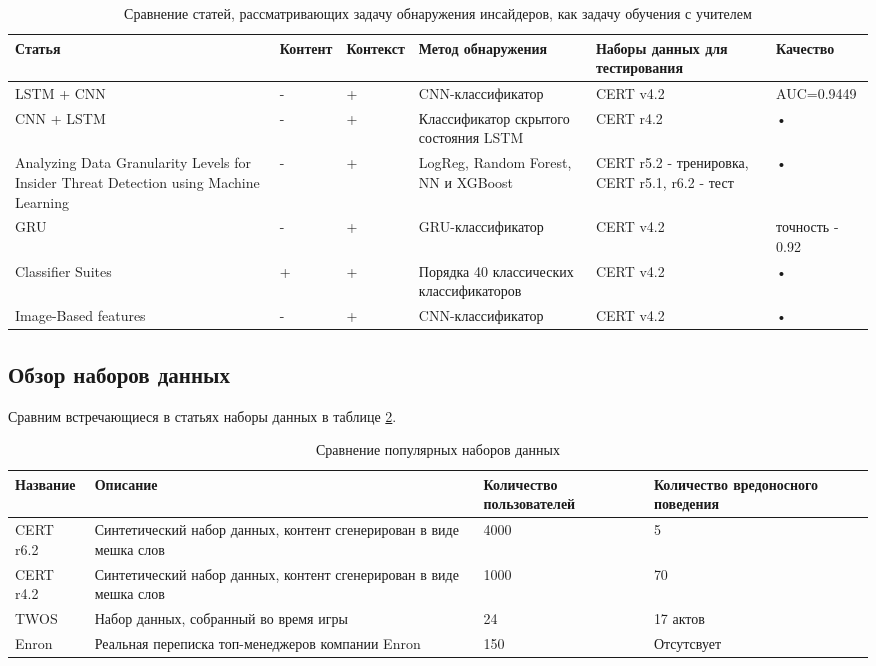 \begin{table}[!h]
\caption{Сравнение статей, рассматривающих задачу обнаружения инсайдеров, как задачу обучения с учителем}
\label{table:2} 
\begin{tabular}{|m{2cm}|m{2cm}|m{2cm}|m{2cm}|p{2cm}|p{2cm}|}
\hline 
Статья & Контент & Контекст & Метод обнаружения & Наборы данных для тестирования & Качество \\ 
\hline 
LSTM + CNN \cite{lstm_cnn} & - & + & CNN-классификатор & CERT v4.2 & AUC=0.9449 \\ 
\hline 
CNN + LSTM \cite{cnn_lstm} & - & + & Классификатор скрытого состояния LSTM & CERT r4.2 & • \\ 
\hline 
Analyzing Data Granularity Levels for Insider Threat Detection using Machine Learning \cite{granual} & - & + & LogReg, Random Forest, NN и XGBoost & CERT r5.2 - тренировка, CERT r5.1, r6.2 - тест   & • \\ 
\hline 
GRU \cite{gru} & - & + & GRU-классификатор & CERT v4.2 & точность - 0.92 \\ 
\hline 
Classifier Suites \cite{suites} & + & + & Порядка 40 классических классификаторов & CERT v4.2 & • \\ 
\hline 
Image-Based features \cite{imagebased} & - & + & CNN-классификатор & CERT v4.2 & • \\ 
\hline
\end{tabular}
\end{table}

\subsection{Обзор наборов данных}
Сравним встречающиеся в статьях наборы данных в таблице \ref{table:3}.
\begin{table}[!h]
\caption{Сравнение популярных наборов данных}
\label{table:3}
\begin{tabular}{|m{3cm}|m{5cm}|m{3cm}|m{3cm}|}
\hline 
Название & Описание & Количество пользователей & Количество вредоносного поведения \\ 
\hline 
CERT r6.2 & Синтетический набор данных, контент сгенерирован в виде мешка слов & 4000 & 5 \\ 
\hline 
CERT r4.2 & Синтетический набор данных, контент сгенерирован в виде мешка слов  & 1000 & 70 \\ 
\hline 
TWOS\cite{twos} & Набор данных, собранный во время игры & 24 & 17 актов \\ 
\hline 
Enron\cite{enron} & Реальная переписка топ-менеджеров компании Enron & 150 & Отсутсвует \\ 
\hline 
\end{tabular} 
\end{table}

